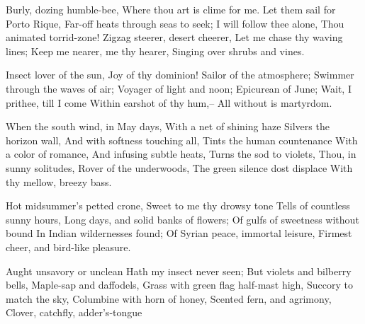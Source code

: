 
\begin{poem}
	\begin{stanza}
		Burly, dozing humble-bee,\verseline
		Where thou art is clime for me.\verseline
		Let them sail for Porto Rique,\verseline
		Far-off heats through seas to seek;\verseline
		I will follow thee alone,\verseline
		Thou animated torrid-zone!\verseline
		Zigzag steerer, desert cheerer,\verseline
		Let me chase thy waving lines;\verseline
		Keep me nearer, me thy hearer,\verseline
		Singing over shrubs and vines.\verseline
	\end{stanza}
	\begin{stanza}
		Insect lover of the sun,\verseline
		Joy of thy dominion!\verseline
		Sailor of the atmosphere;\verseline
		Swimmer through the waves of air;\verseline
		Voyager of light and noon;\verseline
		Epicurean of June;\verseline
		Wait, I prithee, till I come\verseline
		Within earshot of thy hum,--\verseline
		All without is martyrdom.\verseline
	\end{stanza}
	\begin{stanza}
		When the south wind, in May days,\verseline
		With a net of shining haze\verseline
		Silvers the horizon wall,\verseline
		And with softness touching all,\verseline
		Tints the human countenance\verseline
		With a color of romance,\verseline
		And infusing subtle heats,\verseline
		Turns the sod to violets,\verseline
		Thou, in sunny solitudes,\verseline
		Rover of the underwoods,\verseline
		The green silence dost displace\verseline
		With thy mellow, breezy bass.\verseline
	\end{stanza}
	\begin{stanza}
		Hot midsummer's petted crone,\verseline
		Sweet to me thy drowsy tone\verseline
		Tells of countless sunny hours,\verseline
		Long days, and solid banks of flowers;\verseline
		Of gulfs of sweetness without bound\verseline
		In Indian wildernesses found;\verseline
		Of Syrian peace, immortal leisure,\verseline
		Firmest cheer, and bird-like pleasure.\verseline
	\end{stanza}
	\begin{stanza}
		Aught unsavory or unclean\verseline
		Hath my insect never seen;\verseline
		But violets and bilberry bells,\verseline
		Maple-sap and daffodels,\verseline
		Grass with green flag half-mast high,\verseline
		Succory to match the sky,\verseline
		Columbine with horn of honey,\verseline
		Scented fern, and agrimony,\verseline
		Clover, catchfly, adder's-tongue\verseline

\end{stanza}
\end{poem}
